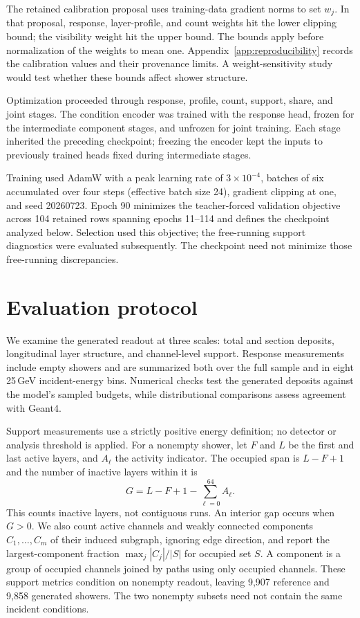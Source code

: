 \documentclass[11pt]{article}
\begin{document}
The retained calibration proposal uses training-data gradient norms to set $w_j$. In that proposal, response, layer-profile, and count weights hit the lower clipping bound; the visibility weight hit the upper bound. The bounds apply before normalization of the weights to mean one. Appendix~\ref{app:reproducibility} records the calibration values and their provenance limits. A weight-sensitivity study would test whether these bounds affect shower structure.

Optimization proceeded through response, profile, count, support, share, and joint stages. The condition encoder was trained with the response head, frozen for the intermediate component stages, and unfrozen for joint training. Each stage inherited the preceding checkpoint; freezing the encoder kept the inputs to previously trained heads fixed during intermediate stages.

Training used AdamW with a peak learning rate of $3\times10^{-4}$, batches of six accumulated over four steps (effective batch size 24), gradient clipping at one, and seed 20260723. Epoch 90 minimizes the teacher-forced validation objective across 104 retained rows spanning epochs 11--114 and defines the checkpoint analyzed below. Selection used this objective; the free-running support diagnostics were evaluated subsequently. The checkpoint need not minimize those free-running discrepancies.

\section{Evaluation protocol}
\label{sec:diagnostics}

We examine the generated readout at three scales: total and section deposits, longitudinal layer structure, and channel-level support. Response measurements include empty showers and are summarized both over the full sample and in eight 25\,GeV incident-energy bins. Numerical checks test the generated deposits against the model's sampled budgets, while distributional comparisons assess agreement with Geant4.

Support measurements use a strictly positive energy definition; no detector or analysis threshold is applied. For a nonempty shower, let $F$ and $L$ be the first and last active layers, and $A_\ell$ the activity indicator. The occupied span is $L-F+1$ and the number of inactive layers within it is
\begin{equation}
 G=L-F+1-\sum_{\ell=0}^{64}A_\ell.
 \label{eq:gaps}
\end{equation}
This counts inactive layers, not contiguous runs. An interior gap occurs when $G>0$. We also count active channels and weakly connected components $C_1,\ldots,C_m$ of their induced subgraph, ignoring edge direction, and report the largest-component fraction $\max_j|C_j|/|S|$ for occupied set $S$. A component is a group of occupied channels joined by paths using only occupied channels. These support metrics condition on nonempty readout, leaving 9,907 reference and 9,858 generated showers. The two nonempty subsets need not contain the same incident conditions.
\end{document}
